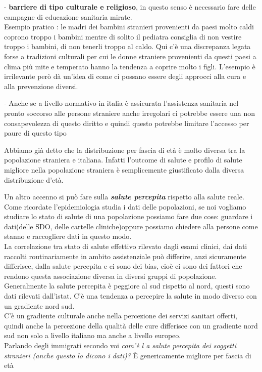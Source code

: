 \documentclass[]{article}
\begin{document}
- \textbf{barriere di tipo culturale e religioso}, in questo senso è
necessario fare delle campagne di educazione sanitaria mirate.\\
Esempio pratico : le madri dei bambini stranieri provenienti da paesi
molto caldi coprono troppo i bambini mentre di solito il pediatra
consiglia di non vestire troppo i bambini, di non tenerli troppo al
caldo. Qui c'è una discrepanza legata forse a tradizioni culturali per
cui le donne straniere provenienti da questi paesi a clima più mite e
temperato hanno la tendenza a coprire molto i figli. L'esempio è
irrilevante però dà un'idea di come ci possano essere degli approcci
alla cura e alla prevenzione diversi.

- Anche se a livello normativo in italia è assicurata l'assistenza
sanitaria nel pronto soccorso alle persone straniere anche irregolari ci
potrebbe essere una non consapevolezza di questo diritto e quindi questo
potrebbe limitare l'accesso per paure di questo tipo

Abbiamo già detto che la distribuzione per fascia di età è molto diversa
tra la popolazione straniera e italiana. Infatti l'outcome di salute e
profilo di salute migliore nella popolazione straniera è semplicemente
giustificato dalla diversa distribuzione d'età.

Un altro accenno si può fare sulla \textbf{\emph{salute percepita}}
rispetto alla salute reale.\\
Come ricordate l'epidemiologia studia i dati delle popolazioni, se noi
vogliamo studiare lo stato di salute di una popolazione possiamo fare
due cose: guardare i dati(delle SDO, delle cartelle cliniche)oppure
possiamo chiedere alla persone come stanno e raccogliere dati in questo
modo.\\
La correlazione tra stato di salute effettivo rilevato dagli esami
clinici, dai dati raccolti routinariamente in ambito assistenziale può
differire, anzi sicuramente differisce, dalla salute percepita e ci sono
dei bias, cioè ci sono dei fattori che rendono questa associazione
diversa in diversi gruppi di popolazione. Generalmente la salute
percepita è peggiore al sud rispetto al nord, questi sono dati rilevati
dall'istat. C'è una tendenza a percepire la salute in modo diverso con
un gradiente nord sud.\\
C'è un gradiente culturale anche nella percezione dei servizi sanitari
offerti, quindi anche la percezione della qualità delle cure differisce
con un gradiente nord sud non solo a livello italiano ma anche a livello
europeo.\\
Parlando degli immigrati secondo voi \emph{com'è l a salute percepita
dei soggetti stranieri (anche questo lo dicono i dati)?} È genericamente
migliore per fascia di età
\end{document}
